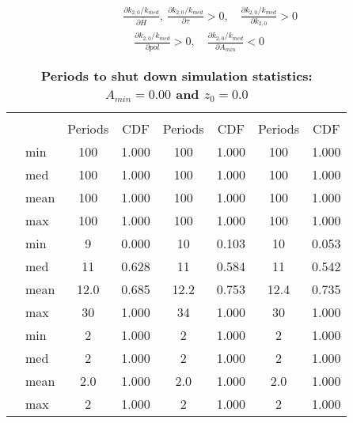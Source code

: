\documentclass[letterpaper,12pt]{article}
\theoremstyle{definition}
\begin{document}
\begin{spacing}{1.5}
  \begin{equation*}
    \begin{split}
      &\frac{\partial k_{2,0}/k_{med}}{\partial\bar{H}},\:\frac{\partial k_{2,0}/k_{med}}{\partial\tau}>0, \quad \frac{\partial k_{2,0}/k_{med}}{\partial k_{2,0}}> 0 \\
      &\quad \frac{\partial k_{2,0}/k_{med}}{\partial pol}> 0, \quad \frac{\partial k_{2,0}/k_{med}}{\partial A_{min}}< 0
    \end{split}
  \end{equation*}

  \newpage

  \begin{table}[htbp]\centering\captionsetup{width=4.6in}
  \caption{\label{TabPer2GO_A0}\textbf{Periods to shut down simulation statistics: $A_{min}=0.00$ and $z_0=0.0$}}
    \begin{threeparttable}
    \begin{tabular}{>{\small}c >{\small}l| >{\small}c >{\small}c| >{\small}c >{\small}c| >{\small}c >{\small}c}
      \hline\hline
      & & \multicolumn{2}{c}{$k_{2,0}=0.11$} & \multicolumn{2}{c}{$k_{2,0}=0.14$} & \multicolumn{2}{c}{$k_{2,0}=0.17$} \\ \cline{3-8}
      & & Periods & CDF & Periods & CDF & Periods & CDF \\
      \hline
      \multirow{4}{*}{$\bar{H}=0.00$}
      & min & 100 & 1.000 & 100 & 1.000 & 100 & 1.000 \\
      & med & 100 & 1.000 & 100 & 1.000 & 100 & 1.000 \\
      & mean & 100 & 1.000 & 100 & 1.000 & 100 & 1.000 \\
      & max & 100 & 1.000 & 100 & 1.000 & 100 & 1.000 \\
      \hline
      \multirow{4}{*}{$\bar{H}=0.05$}
      & min & 9 & 0.000 & 10 & 0.103 & 10 & 0.053 \\
      & med & 11 & 0.628 & 11 & 0.584 & 11 & 0.542 \\
      & mean & 12.0 & 0.685 & 12.2 & 0.753 & 12.4 & 0.735 \\
      & max & 30 & 1.000 & 34 & 1.000 & 30 & 1.000 \\
      \hline
      \multirow{4}{*}{$\bar{H}=0.11$}
      & min & 2 & 1.000 & 2 & 1.000 & 2 & 1.000 \\
      & med & 2 & 1.000 & 2 & 1.000 & 2 & 1.000 \\
      & mean & 2.0 & 1.000 & 2.0 & 1.000 & 2.0 & 1.000 \\
      & max & 2 & 1.000 & 2 & 1.000 & 2 & 1.000 \\

\end{tabular}
\end{threeparttable}
\end{table}
\end{spacing}
\end{document}
